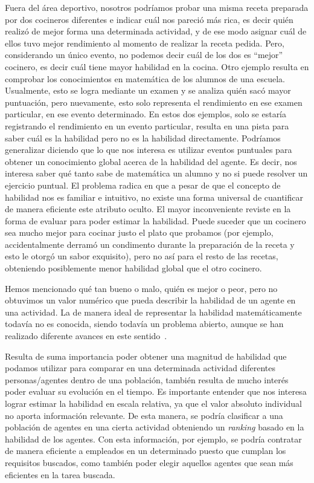 \documentclass[11pt,twoside,spanish]{report} %
\begin{document}
Fuera del \'area deportivo, nosotros podr\'iamos probar una misma receta preparada por dos cocineros diferentes e indicar cu\'al nos pareci\'o m\'as rica, es decir qui\'en realiz\'o de mejor forma una determinada actividad, y de ese modo asignar cu\'al de ellos tuvo mejor rendimiento al momento de realizar la receta pedida.
Pero, considerando un \'unico evento, no podemos decir cu\'al de los dos es ``mejor'' cocinero, es decir cu\'al tiene mayor habilidad en la cocina.
Otro ejemplo resulta en comprobar los conocimientos en matem\'atica de los alumnos de una escuela. 
Usualmente, esto se logra mediante un examen y se analiza qui\'en sac\'o mayor puntuaci\'on, pero nuevamente, esto solo representa el rendimiento en ese examen particular, en ese evento determinado.
En estos dos ejemplos, solo se estar\'ia registrando el rendimiento en un evento particular, resulta en una pista para saber cu\'al es la habilidad pero no es la habilidad directamente.
Podr\'iamos generalizar diciendo que lo que nos interesa es utilizar eventos puntuales para obtener un conocimiento global acerca de la habilidad del agente.
Es decir, nos interesa saber qu\'e tanto sabe de matem\'atica un alumno y no si puede resolver un ejercicio puntual.
El problema radica en que a pesar de que el concepto de habilidad nos es familiar e intuitivo, no existe una forma universal de cuantificar de manera eficiente este atributo oculto.
El mayor inconveniente reviste en la forma de evaluar para poder estimar la habilidad.
Puede suceder que un cocinero sea mucho mejor para cocinar justo el plato que probamos (por ejemplo, accidentalmente derram\'o un condimento durante la preparaci\'on de la receta y esto le otorg\'o un sabor exquisito), pero no as\'i para el resto de las recetas, obteniendo posiblemente menor habilidad global que el otro cocinero.

Hemos mencionado qu\'e tan bueno o malo, qui\'en es mejor o peor, pero no obtuvimos un valor num\'erico que pueda describir la habilidad de un agente en una actividad.
La de manera ideal de representar la habilidad matem\'aticamente todav\'ia no es conocida, siendo todav\'ia un problema abierto, aunque se han realizado diferente avances en este sentido~\cite{elo1961-uscf,glikman_gliko_2,Herbrich2007}.

Resulta de suma importancia poder obtener una magnitud de habilidad que podamos utilizar para comparar en una determinada actividad diferentes personas/agentes dentro de una poblaci\'on, tambi\'en resulta de mucho inter\'es poder evaluar su evoluci\'on en el tiempo.
Es importante entender que nos interesa lograr estimar la habilidad en escala relativa, ya que el valor absoluto individual no aporta informaci\'on relevante.
De esta manera, se podr\'ia clasificar a una poblaci\'on de agentes en una cierta actividad obteniendo un \emph{ranking} basado en la habilidad de los agentes.
Con esta informaci\'on, por ejemplo, se podr\'ia contratar de manera eficiente a empleados en un determinado puesto que cumplan los requisitos buscados, como tambi\'en poder elegir aquellos agentes que sean m\'as eficientes en la tarea buscada.
\end{document}
